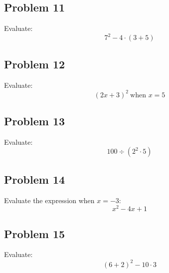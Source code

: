 \documentclass[12pt]{article}
\begin{document}
\subsection*{Problem 11}
Evaluate:  
\[
7^2 - 4 \cdot (3 + 5)
\]

\subsection*{Problem 12}
Evaluate:  
\[
(2x + 3)^2\ \text{when } x = 5
\]

\subsection*{Problem 13}
Evaluate:  
\[
100 \div (2^2 \cdot 5)
\]

\subsection*{Problem 14}
Evaluate the expression when \(x = -3\):  
\[
x^2 - 4x + 1
\]

\subsection*{Problem 15}
Evaluate:  
\[
(6 + 2)^2 - 10 \cdot 3
\]
\end{document}
